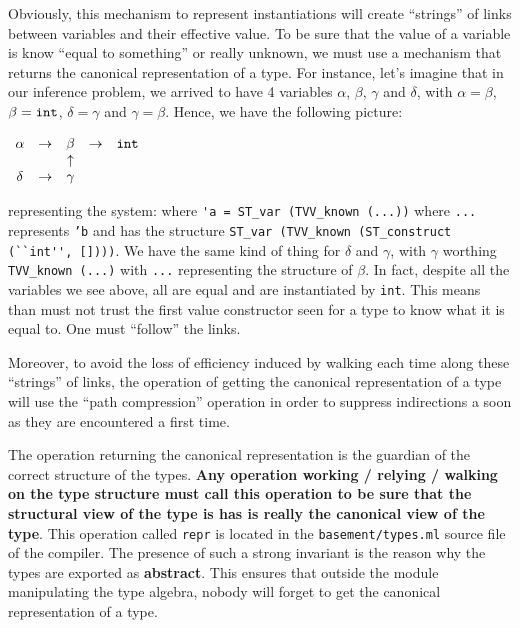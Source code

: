 Obviously, this mechanism to represent instantiations will create
``strings'' of links between variables and their effective value. To
be sure that the value of a variable is know ``equal to something'' or
really unknown, we must use a mechanism that returns the canonical
representation of a type. For instance, let's imagine that in our
inference problem, we arrived to have 4 variables $\alpha$, $\beta$,
$\gamma$ and $\delta$, with $\alpha = \beta$, $\beta = {\tt int}$,
$\delta = \gamma$ and $\gamma = \beta$. Hence, we have the following
picture:

\noindent
\begin{math}
\begin{array}{ccccc}
\alpha & \rightarrow & \beta & \rightarrow & {\tt int} \\
       &             & \uparrow & & \\
\delta & \rightarrow & \gamma & &
\end{array}
\end{math}

\noindent representing the system: where
{\footnotesize\lstinline!'a = ST_var (TVV_known (...))!} where
{\footnotesize\lstinline!...!} represents {\tt 'b} and has the
structure
{\footnotesize\lstinline!ST_var (TVV_known (ST_construct (``int'', [])))!}.
We have the same kind of thing for $\delta$ and $\gamma$, with
$\gamma$ worthing
{\footnotesize\lstinline!TVV_known (...)!} with
{\footnotesize\lstinline!...!} representing the structure of $\beta$.
In fact, despite all the variables we see above, all are equal and are
instantiated by {\tt int}. This means than must not trust the first
value constructor seen for a type to know what it is equal to. One
must ``follow'' the links.

Moreover, to avoid the loss of efficiency induced by walking each
time along these ``strings'' of links, the operation of getting the
canonical representation of a type will use the ``path compression''
operation in order to suppress indirections a soon as they are
encountered a first time.

The operation returning the canonical representation is the guardian
of the correct structure of the types. {\bf Any operation working /
relying / walking on the type structure must call this operation to be
sure that the structural view of the type is has is really the
canonical view of the type}. This operation called {\tt repr} is
located in the {\tt basement/types.ml} source file of the
compiler. The presence of such a strong invariant is the reason why
the types are exported as {\bf abstract}. This ensures that outside
the module manipulating the type algebra, nobody will forget to get
the canonical representation of a type.

